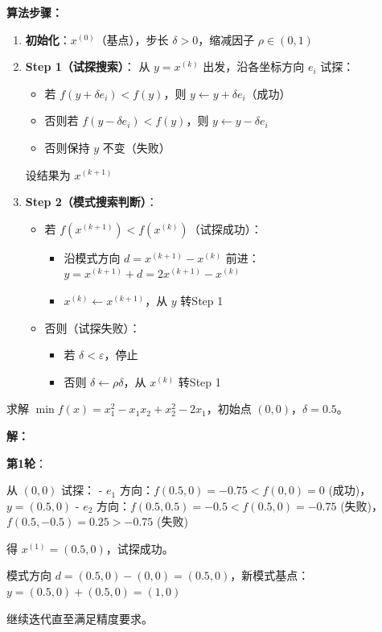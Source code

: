 \textbf{算法步骤：}
\begin{enumerate}
    \item \textbf{初始化}：$x^{(0)}$（基点），步长 $\delta > 0$，缩减因子 $\rho \in (0, 1)$
    
    \item \textbf{Step 1（试探搜索）}：
    从 $y = x^{(k)}$ 出发，沿各坐标方向 $e_i$ 试探：
    \begin{itemize}
        \item 若 $f(y + \delta e_i) < f(y)$，则 $y \leftarrow y + \delta e_i$（成功）
        \item 否则若 $f(y - \delta e_i) < f(y)$，则 $y \leftarrow y - \delta e_i$
        \item 否则保持 $y$ 不变（失败）
    \end{itemize}
    设结果为 $x^{(k+1)}$
    
    \item \textbf{Step 2（模式搜索判断）}：
    \begin{itemize}
        \item 若 $f(x^{(k+1)}) < f(x^{(k)})$（试探成功）：
        \begin{itemize}
            \item 沿模式方向 $d = x^{(k+1)} - x^{(k)}$ 前进：$y = x^{(k+1)} + d = 2x^{(k+1)} - x^{(k)}$
            \item $x^{(k)} \leftarrow x^{(k+1)}$，从 $y$ 转Step 1
        \end{itemize}
        \item 否则（试探失败）：
        \begin{itemize}
            \item 若 $\delta < \varepsilon$，停止
            \item 否则 $\delta \leftarrow \rho \delta$，从 $x^{(k)}$ 转Step 1
        \end{itemize}
    \end{itemize}
\end{enumerate}

\begin{example}
求解 $\min f(x) = x_1^2 - x_1 x_2 + x_2^2 - 2x_1$，初始点 $(0, 0)$，$\delta = 0.5$。

\textbf{解：}

\textbf{第1轮}：

从 $(0,0)$ 试探：
- $e_1$ 方向：$f(0.5, 0) = -0.75 < f(0,0) = 0$ (成功)，$y = (0.5, 0)$
- $e_2$ 方向：$f(0.5, 0.5) = -0.5 < f(0.5, 0) = -0.75$ (失败)，$f(0.5, -0.5) = 0.25 > -0.75$ (失败)

得 $x^{(1)} = (0.5, 0)$，试探成功。

模式方向 $d = (0.5, 0) - (0, 0) = (0.5, 0)$，新模式基点：
$y = (0.5, 0) + (0.5, 0) = (1, 0)$

继续迭代直至满足精度要求。
\end{example}

